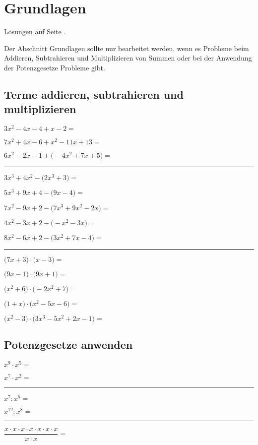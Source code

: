\section{Grundlagen}\label{grch}

Lösungen auf Seite \pageref{grundlagen}.

Der Abschnitt Grundlagen sollte nur bearbeitet werden, wenn es Probleme beim Addieren, Subtrahieren und Multiplizieren von Summen oder bei der Anwendung der Potenzgesetze Probleme gibt.

\subsection{Terme addieren, subtrahieren und multiplizieren}

\begin{aufgaben}
\item $3 x^2-4 x-4 +  x-2 = $
\item $7 x^2+4 x-6 +  x^2-11 x+13 = $
\item $6 x^2-2 x-1 + \big(-4 x^2+7 x+5\big) = $ \\
\hrule
\item $3 x^3+4 x^2 - \big(2 x^3+3\big) =  $
\item $5 x^3+9 x+4 - \big(9 x-4\big) = $
\item $7 x^2-9 x+2 - \big(7 x^3+9 x^2-2 x\big) =$
\item $4 x^2-3 x+2 - \big(- x^2-3 x\big) = $
\item $8 x^2-6 x+2 - \big(3 x^2+7 x-4\big) = $ \\
\hrule
\item $\big(7 x+3\big) \cdot \big( x-3\big) = $ \\
\item $\big(9 x-1\big) \cdot \big(9 x+1\big) = $ \\
\item $\big( x^2+6\big) \cdot \big(-2 x^2+7\big) = $ \\
\item $\big( 1+x\big) \cdot \big( x^2-5 x-6\big) =  $ \\
\item $\big( x^2-3\big) \cdot \big(3 x^3-5 x^2+2 x-1\big) =$
\end{aufgaben}

\subsection{Potenzgesetze anwenden}

\begin{aufgaben}
\item $x^9\cdot x^5=$
\item $x^7\cdot x^2=$
\hrule
\item $x^7:x^5 = $
\item $x^{12}:x^{8}=$
\hrule
\item $\dfrac{x\cdot x\cdot x\cdot x\cdot x\cdot x\cdot x}{x\cdot x}=$
\end{aufgaben}